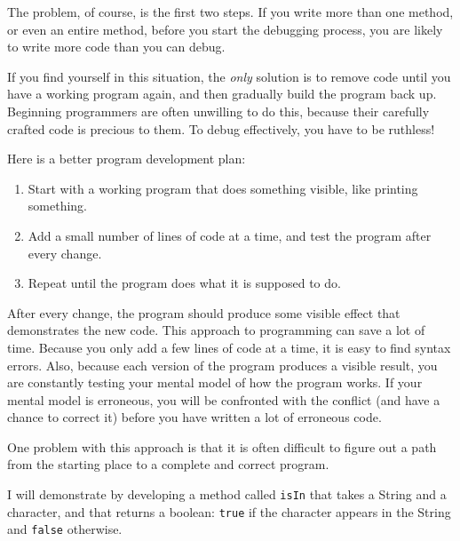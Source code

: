 \documentclass{book}
\begin{document}
The problem, of course, is the first two steps.  If you
write more than one method, or even an entire method, before
you start the debugging process, you are likely to write more
code than you can debug.

If you find yourself in this situation, the {\em only} solution
is to remove code until you have a working program again, and
then gradually build the program back up.  Beginning programmers
are often unwilling to do this, because their carefully crafted
code is precious to them.  To debug effectively, you have to
be ruthless!


Here is a better program development plan:

\begin{enumerate}

\item Start with a working program that does something visible,
   like printing something.

\item Add a small number of lines of code at a time,
   and test the program after every change.

\item Repeat until the program does what it is supposed to do.

\end{enumerate}

After every change, the program should produce some visible effect
that demonstrates the new code.  This approach to programming can save
a lot of time.  Because you only add a few lines of code at a time, it
is easy to find syntax errors.  Also, because each version of the
program produces a visible result, you are constantly testing your
mental model of how the program works.  If your mental model is
erroneous, you will be confronted with the conflict (and have a chance
to correct it) before you have written a lot of erroneous code.

One problem with this approach is that it is often
difficult to figure out a path from the starting place
to a complete and correct program.

I will demonstrate by developing a method called {\tt isIn} that takes
a String and a character, and that returns a boolean: {\tt true} if
the character appears in the String and {\tt false} otherwise.
\end{document}

